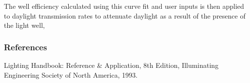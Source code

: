 The well efficiency calculated using this curve fit and user inputs is then applied to daylight transmission rates to attenuate daylight as a result of the presence of the light well,

\subsubsection{References}\label{references-2-004}

Lighting Handbook: Reference \& Application, 8th Edition, Illuminating Engineering Society of North America, 1993.
